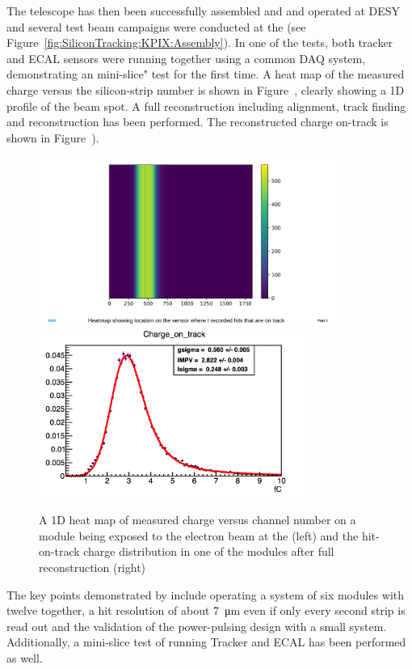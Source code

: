 The \LYCORIS telescope has then been successfully assembled and and operated at DESY and several test beam campaigns were conducted at the \DIITBF (see Figure~\ref{fig:SiliconTracking:KPIX:Assembly}). 
In one of the tests, both \SID tracker and \SID ECAL sensors were running together using a common DAQ system, demonstrating an \SID mini-slice" test for the first time. 
A heat map of the measured charge versus the silicon-strip number is shown in Figure~\label{fig:SiliconTracking:KPIX:Results}, clearly showing a 1D profile of the beam spot. 
A full reconstruction including alignment, track finding and reconstruction has been performed. The reconstructed charge on-track is shown in Figure~\label{fig:SiliconTracking:KPIX:Results}). 

\begin{figure}[htbp]
\includegraphics[height=5.5cm]{Tracker/KPIX/KPIX_heatmap_hitsOnTrack.pdf}
\includegraphics[height=5.5cm]{Tracker/KPIX/KPIX_signal_Landau_Run897.png}
\caption{A 1D heat map of measured charge versus channel number on a \LYCORIS module being exposed to the electron beam at the \DIITBF (left) and the hit-on-track charge distribution in 
one of the \LYCORIS modules after full reconstruction (right)}
\label{fig:SiliconTracking:KPIX:Results}
\end{figure}


The key points demonstrated by \LYCORIS include operating a system of six modules with twelve \KPIX together, 
a hit resolution of about \SI{7}{\micro\meter} even if only every second strip is read out and the 
validation of the power-pulsing design with a small system. Additionally, a mini-slice test of running \SiD Tracker and \SID ECAL has been performed as well. 


